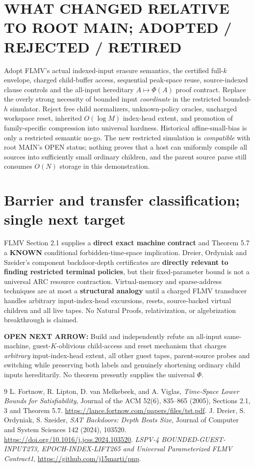\documentclass[11pt]{article}
\begin{document}
\section*{WHAT CHANGED RELATIVE TO ROOT MAIN; ADOPTED / REJECTED / RETIRED}
Adopt FLMV's actual indexed-input erasure semantics, the certified full-$k$ envelope, charged child-buffer access, sequential peak-space reuse, source-indexed clause controls and the all-input hereditary $A\mapsto\Phi(A)$ proof contract. Replace the overly strong necessity of bounded input \emph{coordinate} in the restricted bounded-$h$ simulator. Reject free child normalizers, unknown-policy oracles, uncharged workspace reset, inherited $O(\log M)$ index-head extent, and promotion of family-specific compression into universal hardness. Historical affine-small-bias is only a restricted semantic no-go. The new restricted simulation is \emph{compatible} with root MAIN's OPEN status; nothing proves that a host can uniformly compile all sources into sufficiently small ordinary children, and the parent source parse still consumes $O(N)$ storage in this demonstration.

\section*{Barrier and transfer classification; single next target}
FLMV Section 2.1 supplies a \textbf{direct exact machine contract} and Theorem 5.7 a \textbf{KNOWN} conditional forbidden-time-space implication. Dreier, Ordyniak and Szeider's component backdoor-depth certificates are \textbf{directly relevant to finding restricted terminal policies}, but their fixed-parameter bound is not a universal ARC resource contraction. Virtual-memory and sparse-address techniques are at most a \textbf{structural analogy} until a charged FLMV transducer handles arbitrary input-index-head excursions, resets, source-backed virtual children and all live tapes. No Natural Proofs, relativization, or algebrization breakthrough is claimed.

\textbf{OPEN NEXT ARROW:} Build and independently refute an all-input same-machine, guest-$K$-oblivious child-access and reset mechanism that charges \emph{arbitrary} input-index-head extent, all other guest tapes, parent-source probes and switching while preserving both labels and genuinely shortening ordinary child inputs hereditarily. No theorem presently supplies the universal $\Phi$.

\begin{thebibliography}{9}
 L. Fortnow, R. Lipton, D. van Melkebeek, and A. Viglas, \emph{Time-Space Lower Bounds for Satisfiability}, Journal of the ACM 52(6), 835--865 (2005), Sections 2.1, 3 and Theorem 5.7. \url{https://lance.fortnow.com/papers/files/tst.pdf}.
 J. Dreier, S. Ordyniak, S. Szeider, \emph{SAT Backdoors: Depth Beats Size}, Journal of Computer and System Sciences 142 (2024), 103520. \url{https://doi.org/10.1016/j.jcss.2024.103520}.
 \emph{LSPV-4 BOUNDED-GUEST-INPUT273, EPOCH-INDEX-LIFT265 and Universal Parameterized FLMV Contract1}, \url{https://github.com/j15marti/pnp}.
\end{thebibliography}
\end{document}
